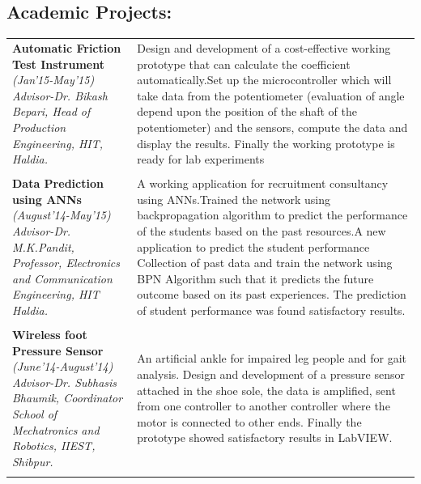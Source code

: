 \documentclass[8pt]{article}
\newcommand{\tn}{\tabularnewline}
\begin{document}
\subsection*{Academic Projects:}
\vspace{-0.2cm}
\begin{supertabular}{p{5.0cm}!{\color{lightgrey}\vrule}p{13.3cm}}
\parbox[t]{5.0cm}{\textbf{Automatic Friction Test Instrument} \textit{(Jan'15-May'15)}\\ \textit{Advisor-Dr. Bikash Bepari, Head of Production Engineering, HIT, Haldia.}} & Design and development of a cost-effective working prototype that can calculate the coefficient automatically.\newline Set up the microcontroller which will take data from the potentiometer (evaluation of angle depend upon the position of the shaft of the potentiometer) and the sensors, compute the data and display the results. \newline Finally the working prototype is ready for lab experiments\\ \tn[5pt]

\parbox[t]{5.0cm}{\textbf{Data Prediction using ANNs}\\ \textit{(August'14-May'15)}\\ \textit{Advisor-Dr. M.K.Pandit, Professor, Electronics and Communication Engineering, HIT Haldia.}} &A working application for recruitment consultancy using ANNs.\newline Trained the network using backpropagation algorithm to predict the performance of the students based on the past resources.\newline A new application to predict the student performance Collection of past data and train the network using BPN Algorithm such that it predicts the future outcome based on its past experiences. \newline The prediction of student performance was found satisfactory results. \\ \tn[5pt]

\parbox[t]{5.0cm}{\textbf{Wireless foot Pressure Sensor}\\ \textit{(June'14-August'14)}\\ \textit{Advisor-Dr. Subhasis Bhaumik, Coordinator School of Mechatronics and Robotics, IIEST, Shibpur.}}& An artificial ankle for impaired leg people and for gait analysis. \newline Design and development of a pressure sensor attached in the shoe sole, the data is amplified, sent from one controller to another controller where the motor is connected to other ends. \newline Finally the prototype showed satisfactory results in LabVIEW. \\\tn[5pt]

\end{supertabular}
\end{document}

